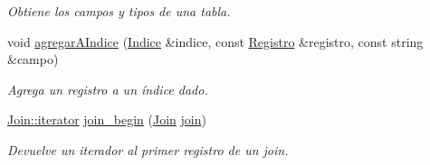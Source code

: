 \begin{DoxyCompactItemize}
\begin{DoxyCompactList}\small\item\em Obtiene los campos y tipos de una tabla. \end{DoxyCompactList}\item 
void \hyperlink{classBaseDeDatos_a880168af66cefb35fc13111d64b41e5d}{agregar\-A\-Indice} (\hyperlink{classBaseDeDatos_a5672205542180582d4fb39817e6753e0}{Indice} \&indice, const \hyperlink{classRegistro}{Registro} \&registro, const string \&campo)
\begin{DoxyCompactList}\small\item\em Agrega un registro a un índice dado. \end{DoxyCompactList}\item 
\hyperlink{structBaseDeDatos_1_1Join_1_1iterator}{Join\-::iterator} \hyperlink{classBaseDeDatos_a260e3becd45c0746093991816a8387f4}{join\-\_\-begin} (\hyperlink{structBaseDeDatos_1_1Join}{Join} \hyperlink{classBaseDeDatos_a90db1eea7c903c7c736abd45eea0e855}{join})
\begin{DoxyCompactList}\small\item\em Devuelve un iterador al primer registro de un join. \end{DoxyCompactList}\end{DoxyCompactItemize}

